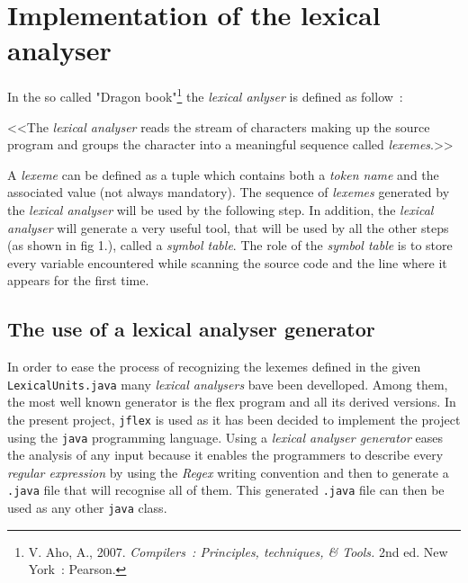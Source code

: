 \documentclass[a4paper,11pt]{article}
\begin{document}
\section{Implementation of the lexical analyser}

  In the so called "Dragon book"\footnote{V. Aho, A., 2007. \textit{Compilers~: Principles, techniques, \& Tools.} 2nd ed. New York~: Pearson.} the \textit{lexical anlyser} is defined as follow~:
  \begin{center}
    <<The \textit{lexical analyser} reads the stream of characters making up the source program and groups the character into a meaningful sequence called \textit{lexemes}.>>
  \end{center}
  A \textit{lexeme} can be defined as a tuple which contains both a \textit{token name} and the associated value (not always mandatory). The sequence of \textit{lexemes} generated by the \textit{lexical analyser} will be used by the following step. In addition, the \textit{lexical analyser} will generate a very useful tool, that will be used by all the other steps (as shown in fig 1.), called a \textit{symbol table}. The role of the \textit{symbol table} is to store every variable encountered while scanning the source code and the line where it appears for the first time.\\
  
  \subsection{The use of a lexical analyser generator}
    In order to ease the process of recognizing the lexemes defined in the given \verb|LexicalUnits.java| many \textit{lexical analysers} bave been develloped. Among them, the most well known generator is the flex program and all its derived versions. In the present project, \verb|jflex| is used as it has been decided to implement the project using the \verb|java| programming language. Using a \textit{lexical analyser generator} eases the analysis of any input because it enables the programmers to describe every \textit{regular expression} by using the \textit{Regex} writing convention and then to generate a \verb|.java| file that will recognise all of them. This generated \verb|.java| file can then be used as any other \verb|java| class. 
  
\end{document}
